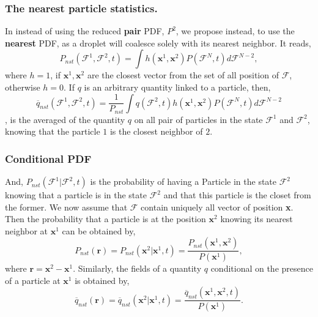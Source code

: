 \documentclass{sintefbeamer}
\newcommand{\nstavg}[1]{\overline{#1}_{nst}}
\begin{document}
\begin{frame}
  \frametitle{The nearest particle statistics.}
In instead of using the reduced \textbf{pair} PDF, $P^2$, 
we propose instead, to use the \textbf{nearest} PDF, as a droplet will coalesce solely with its nearest neighbor.
It reads,
\begin{equation*}
  P_{nst}(\mathcal{F}^1,\mathcal{F}^2 ,t) = \int h(\textbf{x}^1, \textbf{x}^2) P(\mathcal{F}^N,t) d\mathcal{F}^{N-2},
\end{equation*}
where $h=1$, if $\textbf{x}^1, \textbf{x}^2$ are the closest vector from the set of all position of $\mathcal{F}$, otherwise $h=0$. 
If $q$ is an arbitrary quantity linked to a particle, then, 
$$\nstavg{q}(\mathcal{F}^1,\mathcal{F}^2 ,t) =\frac{1}{P_{nst}} \int q(\mathcal{F}^2,t) h(\textbf{x}^1, \textbf{x}^2) P(\mathcal{F}^N,t) d\mathcal{F}^{N-2}$$,
is the averaged of the quantity $q$ on all pair of particles in the state $\mathcal{F}^1$ and $\mathcal{F}^2$, knowing that the particle $1$ is the closest neighbor of $2$. 
\end{frame}
\begin{frame}
  \frametitle{Conditional PDF}
  And, $P_{nst}(\mathcal{F}^1| \mathcal{F}^2, t)$ is the probability of having a Particle in the state $\mathcal{F}^2$ knowing that a particle is in the state $\mathcal{F}^2$ and that this particle is the closet from the former. 
  We now assume that $\mathcal{F}$ contain uniquely all vector of position \textbf{x}. 
  Then the probability that a particle is at the position $\textbf{x}^2$ knowing its nearest neighbor at $\textbf{x}^1$ can be obtained by,
  \begin{equation*}
    P_{nst}(\textbf{r})=P_{nst}(\textbf{x}^2 | \textbf{x}^1 , t) = \frac{P_{nst}(\textbf{x}^1,\textbf{x}^2)}{P(\textbf{x}^1)},
  \end{equation*} 
  where $\textbf{r} = \textbf{x}^2 - \textbf{x}^1$.
  Similarly, the fields of a quantity $q$ conditional on the presence of a particle at $\textbf{x}^1$ is obtained by, 
  \begin{equation*}
    \nstavg{q}(\textbf{r}) =\nstavg{q}(\textbf{x}^2 | \textbf{x}^1 , t) = \frac{\nstavg{q}(\textbf{x}^1,\textbf{x}^2 ,t)}{P(\textbf{x}^1)}.
  \end{equation*}


\end{frame}
\end{document}
